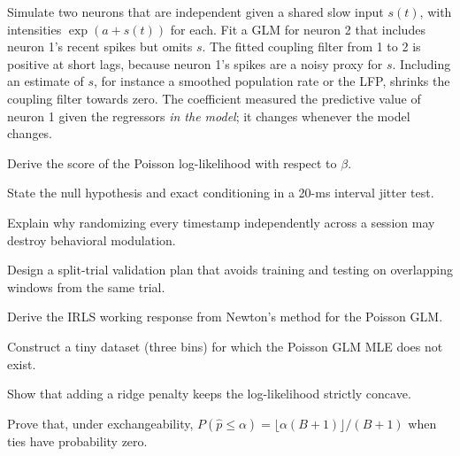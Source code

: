 \begin{workedexample}
Simulate two neurons that are independent given a shared slow input $s(t)$, with intensities $\exp(a+s(t))$ for each. Fit a GLM for neuron 2 that includes neuron 1's recent spikes but omits $s$. The fitted coupling filter from 1 to 2 is positive at short lags, because neuron 1's spikes are a noisy proxy for $s$. Including an estimate of $s$, for instance a smoothed population rate or the LFP, shrinks the coupling filter towards zero. The coefficient measured the predictive value of neuron 1 given the regressors \emph{in the model}; it changes whenever the model changes.
\end{workedexample}
\begin{exercises}
\item Derive the score of the Poisson log-likelihood with respect to $\beta$.
\item State the null hypothesis and exact conditioning in a 20-ms interval jitter test.
\item Explain why randomizing every timestamp independently across a session may destroy behavioral modulation.
\item Design a split-trial validation plan that avoids training and testing on overlapping windows from the same trial.
\item Derive the IRLS working response from Newton's method for the Poisson GLM.
\item Construct a tiny dataset (three bins) for which the Poisson GLM MLE does not exist.
\item Show that adding a ridge penalty keeps the log-likelihood strictly concave.
\item Prove that, under exchangeability, $P(\hat p\le\alpha)=\lfloor\alpha(B+1)\rfloor/(B+1)$ when ties have probability zero.
\end{exercises}
